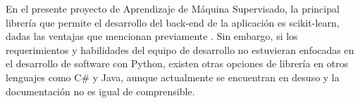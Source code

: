 En el presente proyecto de Aprendizaje de Máquina Supervisado, la principal librería que permite el desarrollo del back-end de la aplicación es scikit-learn, dadas las ventajas que mencionan previamente \textcite{scikit-learn}. Sin embargo, si los requerimientos y habilidades del equipo de desarrollo no estuvieran enfocadas en el desarrollo de software con Python, existen otras opciones de librería en otros lenguajes como C\# y Java, aunque actualmente se encuentran en desuso y la documentación no es igual de comprensible.